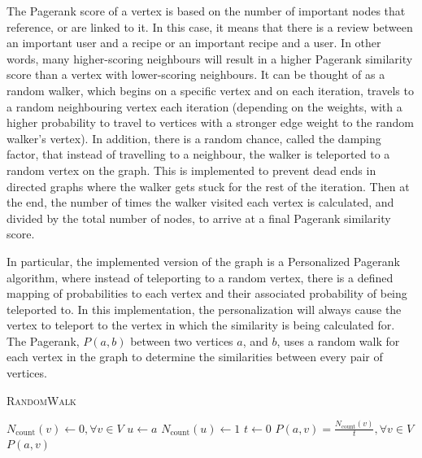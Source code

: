 \documentclass[fontsize=11pt]{article}
\begin{document}
The Pagerank score of a vertex is based on the number of important nodes that reference, or are linked to it. In this case, it means that there is a review between an important user and a recipe or an important recipe and a user. In other words, many higher-scoring neighbours will result in a higher Pagerank similarity score than a vertex with lower-scoring neighbours. It can be thought of as a random walker, which begins on a specific vertex and on each iteration, travels to a random neighbouring vertex each iteration (depending on the weights, with a higher probability to travel to vertices with a stronger edge weight to the random walker's vertex). In addition, there is a random chance, called the damping factor, that instead of travelling to a neighbour, the walker is teleported to a random vertex on the graph. This is implemented to prevent dead ends in directed graphs where the walker gets stuck for the rest of the iteration. Then at the end, the number of times the walker visited each vertex is calculated, and divided by the total number of nodes, to arrive at a final Pagerank similarity score. 

In particular, the implemented version of the graph is a Personalized Pagerank algorithm, where instead of teleporting to a random vertex, there is a defined mapping of probabilities to each vertex and their associated probability of being teleported to. In this implementation, the personalization will always cause the vertex to teleport to the vertex in which the similarity is being calculated for. The Pagerank, $P(a, b)$ between two vertices $a$, and $b$, uses a random walk for each vertex in the graph to determine the similarities between every pair of vertices. 

\begin{algorithm}[H]
    \setcounter{AlgoLine}{0}
    \caption{\textsc{RandomWalk}}
    $N_{\text{count}}(v) \gets 0, \forall v \in V$\;
    $u \gets a$\;
    $N_{\text{count}}(u) \gets 1$\;
    $t \gets 0$\;
    $P(a, v) = \frac{N_{\text{count}}(v)}{t}, \forall v \in V$\;
    \Return $P(a, v)$
\end{algorithm}
\end{document}
